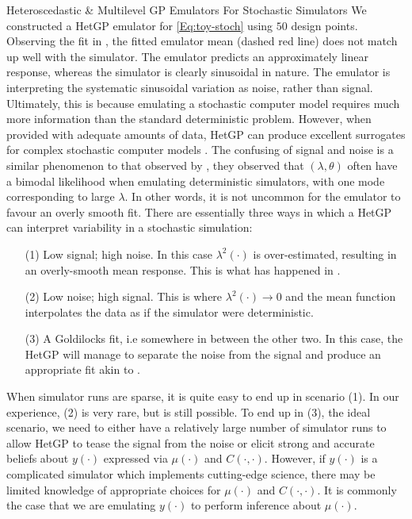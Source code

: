 \begin{chapter}{Heteroscedastic \& Multilevel GP Emulators For Stochastic Simulators\label{Ch:Hetsml}}
We constructed a HetGP emulator for \cref{Eq:toy-stoch} using $50$ design points. Observing the fit in , the fitted emulator mean (dashed red line) does not match up well with the simulator. The emulator predicts an approximately linear response, whereas the simulator is clearly sinusoidal in nature. The emulator is interpreting the systematic sinusoidal variation as noise, rather than signal. Ultimately, this is because emulating a stochastic computer model requires much more information than the standard deterministic problem. However, when provided with adequate amounts of data, HetGP can produce excellent surrogates for complex stochastic computer models \citep{Binois2018}. The confusing of signal and noise is a similar phenomenon to that observed by \citet{Andrianakis2012}, they observed that $(\lambda, \theta)$ often have a bimodal likelihood when emulating deterministic simulators, with one mode corresponding to large $\lambda$. In other words, it is not uncommon for the emulator to favour an overly smooth fit. There are essentially three ways in which a HetGP can interpret variability in a stochastic simulation:
\begin{itemize}
	\item[(1)] Low signal; high noise. In this case $\lambda^2(\cdot)$ is over-estimated, resulting in an overly-smooth mean response. This is what has happened in .
	\item[(2)] Low noise; high signal. This is where $\lambda^2(\cdot) \to 0$ and the mean function interpolates the data as if the simulator were deterministic.
	\item[(3)] A Goldilocks fit, i.e somewhere in between the other two. In this case, the HetGP will manage to separate the noise from the signal and produce an appropriate fit akin to .
\end{itemize}
When simulator runs are sparse, it is quite easy to end up in scenario (1). In our experience, (2) is very rare, but is still possible. To end up in (3), the ideal scenario, we need to either have a relatively large number of simulator runs to allow HetGP to tease the signal from the noise or elicit strong and accurate beliefs about $y(\cdot)$ expressed via $\mu(\cdot)$ and $C(\cdot, \cdot)$. However, if $y(\cdot)$ is a complicated simulator which implements cutting-edge science, there may be limited knowledge of appropriate choices for $\mu(\cdot)$ and $C(\cdot, \cdot)$. It is commonly the case that we are emulating $y(\cdot)$ to perform inference about $\mu(\cdot)$.

\end{chapter}

